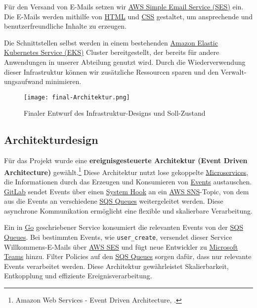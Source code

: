 Für den Versand von E-Mails setzen wir \hyperlink{SES}{\textcolor{AOBlau}{AWS Simple Email Service (SES)}} ein. Die E-Mails werden mithilfe von \hyperlink{HTML}{\textcolor{AOBlau}{HTML}} und \hyperlink{CSS}{\textcolor{AOBlau}{CSS}} gestaltet, um ansprechende und benutzerfreundliche Inhalte zu erzeugen.

Die Schnittstellen selbst werden in einem bestehenden \hyperlink{EKS}{\textcolor{AOBlau}{Amazon Elastic Kubernetes Service (EKS)}} Cluster bereitgestellt, der bereits für andere Anwendungen in unserer Abteilung genutzt wird. Durch die Wiederverwendung dieser Infrastruktur können wir zusätzliche Ressourcen sparen und den Verwalt-
ungsaufwand minimieren.

\begin{figure}[h]
	\centering
	\texttt{[image: final-Architektur.png]}
	\caption{Finaler Entwurf des Infrastruktur-Designs und Soll-Zustand}
\end{figure}

\subsection{Architekturdesign}
\label{sec:Architekturdesign}

Für das Projekt wurde eine \textbf{ereignisgesteuerte Architektur (Event Driven Architecture)} gewählt.\footnote{Amazon Web Services - Event Driven Architecture, \cite{awsEDA}.} Diese Architektur nutzt lose gekoppelte \hyperlink{Microservices}{\textcolor{AOBlau}{Microservices}}, die Informationen durch das Erzeugen und Konsumieren von \hyperlink{GitLabEvent}{\textcolor{AOBlau}{Events}} austauschen. \hyperlink{GitLab}{\textcolor{AOBlau}{GitLab}} sendet Events über einen \hyperlink{GitLabSystemhooks}{\textcolor{AOBlau}{System Hook}} an ein \hyperlink{SNS}{\textcolor{AOBlau}{AWS SNS}}-Topic, von dem aus die Events an verschiedene \hyperlink{SQS}{\textcolor{AOBlau}{SQS Queues}} weitergeleitet werden. Diese asynchrone Kommunikation ermöglicht eine flexible und skalierbare Verarbeitung.

Ein in \hyperlink{Go}{\textcolor{AOBlau}{Go}} geschriebener Service konsumiert die relevanten Events von der \hyperlink{SQS}{\textcolor{AOBlau}{SQS Queues}}. Bei bestimmten Events, wie \texttt{user\_create}, versendet dieser Service Willkommens-E-Mails über \hyperlink{SES}{\textcolor{AOBlau}{AWS SES}} und fügt neue Entwickler zu \hyperlink{MicrosoftTeams}{\textcolor{AOBlau}{Microsoft Teams}} hinzu. Filter Policies auf den \hyperlink{SQS}{\textcolor{AOBlau}{SQS Queues}} sorgen dafür, dass nur relevante Events verarbeitet werden. Diese Architektur gewährleistet Skalierbarkeit, Entkopplung und effiziente Ereignisverarbeitung.

